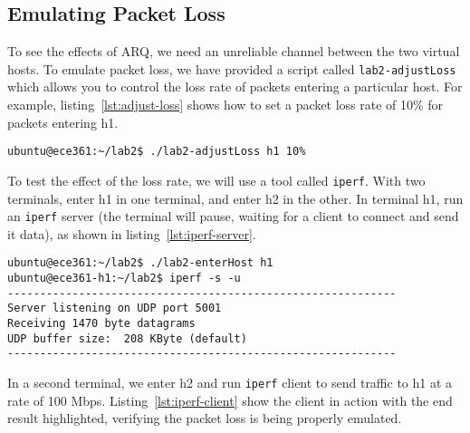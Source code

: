 \documentclass[11pt]{article}
\begin{document}

\subsection{Emulating Packet Loss}
To see the effects of ARQ, we need an unreliable channel between the two virtual hosts.
To emulate packet loss, we have provided a script called \texttt{lab2-adjustLoss} which allows you to control the loss rate of packets entering a particular host.
For example, listing~\ref{lst:adjust-loss} shows how to set a packet loss rate of 10\% for packets entering h1.


\begin{lstlisting}[style=ece361shell, caption={Emulating 10\% packet loss for packets entering h1.}, label={lst:adjust-loss}]
ubuntu@ece361:~/lab2$ ./lab2-adjustLoss h1 10%
\end{lstlisting}

To test the effect of the loss rate, we will use a tool called \texttt{iperf}.
With two terminals, enter h1 in one terminal, and enter h2 in the other.
In terminal h1, run an \texttt{iperf} server (the terminal will pause, waiting for a client to connect and send it data), as shown in listing~\ref{lst:iperf-server}.

\begin{lstlisting}[style=ece361shell, caption={Running an \texttt{iperf} server in h1.}, label={lst:iperf-server}]
ubuntu@ece361:~/lab2$ ./lab2-enterHost h1
ubuntu@ece361-h1:~/lab2$ iperf -s -u
------------------------------------------------------------
Server listening on UDP port 5001
Receiving 1470 byte datagrams
UDP buffer size:  208 KByte (default)
------------------------------------------------------------

\end{lstlisting}

In a second terminal, we enter h2 and run \texttt{iperf} client to send traffic to h1 at a rate of 100 Mbps.
Listing~\ref{lst:iperf-client} show the client in action with the end result highlighted, verifying the packet loss is being properly emulated.
\end{document}
